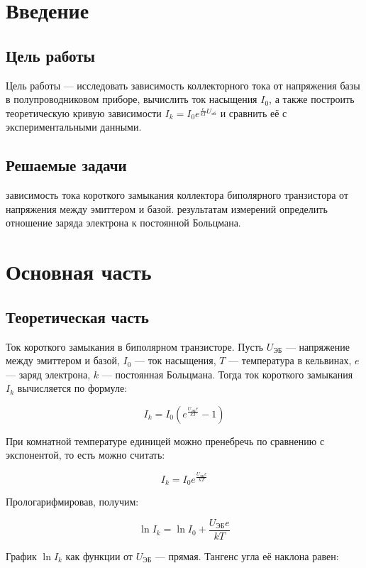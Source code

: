 \section{Введение}
\subsection{Цель работы}
Цель работы — исследовать зависимость коллекторного тока от напряжения базы в полупроводниковом приборе, вычислить ток насыщения \( I_0 \), а также построить теоретическую кривую зависимости \( I_k = I_0 e^{\frac{e}{kT} U_{\text{эб}}} \) и сравнить её с экспериментальными данными.

\subsection{Решаемые задачи}
\begin{enumerate}
 зависимость тока короткого замыкания коллектора биполярного
транзистора от напряжения между эмиттером и базой.
 результатам измерений определить отношение заряда электрона к
постоянной Больцмана.
\end{enumerate}

\section{Основная часть}

\subsection{Теоретическая часть}
Ток короткого замыкания в биполярном транзисторе. Пусть \( U_{\text{ЭБ}} \) — напряжение между эмиттером и базой, \( I_0 \) — ток насыщения, \( T \) — температура в кельвинах, \( e \) — заряд электрона, \( k \) — постоянная Больцмана. Тогда ток короткого замыкания \( I_k \) вычисляется по формуле:

\[
I_k = I_0 \left( e^{\frac{U_{\text{ЭБ}} e}{kT}} - 1 \right)
\]

При комнатной температуре единицей можно пренебречь по сравнению с экспонентой, то есть можно считать:

\[
I_k = I_0 e^{\frac{U_{\text{ЭБ}} e}{kT}}
\]

Прологарифмировав, получим:

\[
\ln I_k = \ln I_0 + \frac{U_{\text{ЭБ}} e}{kT}
\]

График \( \ln I_k \) как функции от \( U_{\text{ЭБ}} \) — прямая. Тангенс угла её наклона равен:

